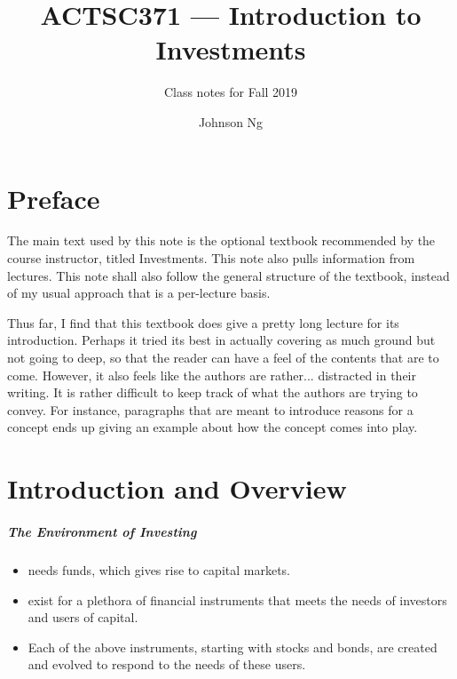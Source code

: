 \documentclass[notoc,notitlepage]{tufte-book}
\title{ACTSC371 --- Introduction to Investments}
\author{Johnson Ng}
\subtitle{Class notes for Fall 2019}
\begin{document}


\chapter*{Preface}%
\label{chp:preface}

The main text used by this note is the optional textbook
recommended by the course instructor, titled Investments.
\cite{bodie2015}
This note also pulls information from lectures.
This note shall also follow the general structure of the textbook,
instead of my usual approach that is a per-lecture basis.

Thus far, I find that this textbook does give a pretty long lecture
for its introduction. Perhaps it tried its best in actually
covering as much ground but not going to deep, so that the reader
can have a feel of the contents that are to come.
However, it also feels like the authors are rather... distracted
in their writing. It is rather difficult to keep track
of what the authors are trying to convey. For instance,
paragraphs that are meant to introduce reasons for a concept
ends up giving an example about how the concept comes into play.


\chapter{Introduction and Overview}%
\label{chp:introduction_and_overview}

\paragraph{The Environment of Investing}\label{paragraph:the_environment_of_investing}

\begin{itemize}
  \item {} needs funds, which gives rise to capital
    markets.
  \item {} exist for a plethora of financial instruments
    that meets the needs of investors and users of capital.
  \item Each of the above instruments, starting with stocks and bonds,
    are created and evolved to respond to the needs of these users.
\end{itemize}
\end{document}
